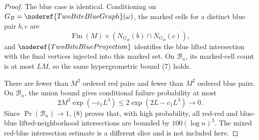 \begin{proof}
The blue case is identical.  Conditioning on
\(G_B=\noderef{TwoBiteBlueGraph}(\omega)\), the marked cells for a distinct
blue pair \(b,c\) are
\[
\operatorname{Fin}(M)\times (N_{G_B}(b)\cap N_{G_B}(c)),
\]
and \(\noderef{TwoBiteBlueProjection}\) identifies the blue lifted
intersection with the final vertices injected into this marked set.  On
\(\mathcal B_n\), its marked-cell count is at most \(LM\), so the same
hypergeometric bound (7) holds.

There are fewer than \(M^2\) ordered red pairs and fewer than \(M^2\) ordered
blue pairs.  On \(\mathcal B_n\), the union bound gives conditional failure
probability at most
\[
2M^2\exp(-c_1L^3)
\le 2\exp(2L-c_1L^3)\to0.
\tag{8}
\]
Since \(\Pr(\mathcal B_n)\to1\), (8) proves that, with high probability, all
red-red and blue-blue lifted-neighborhood intersections are bounded by
\(100(\log n)^3\).  The mixed red-blue intersection estimate is a different
slice and is not included here.
\end{proof}

